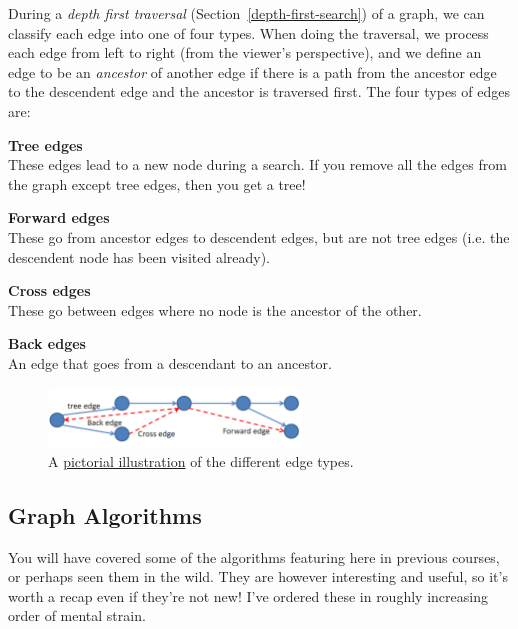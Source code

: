 During a \textit{depth first traversal} (Section~\ref{depth-first-search}) of a
graph, we can classify each edge into one of four types. When doing the
traversal, we process each edge from left to right (from the viewer's
perspective), and we define an edge to be an \textit{ancestor} of another edge
if there is a path from the ancestor edge to the descendent edge and the ancestor
is traversed first. The four types of edges are:

\begin{description}
  \item \textbf{Tree edges}\\
    These edges lead to a new node during a search. If you remove all the edges 
    from the graph except tree edges, then you get a tree!
  \item \textbf{Forward edges}\\
    These go from ancestor edges to descendent edges, but are not tree edges
    (i.e. the descendent node has been visited already).
  \item \textbf{Cross edges}\\
    These go between edges where no node is the ancestor of the other.
  \item \textbf{Back edges}\\
    An edge that goes from a descendant to an ancestor.
\end{description}

\begin{figure}[h]
  \centering
  \includegraphics[width=0.6\textwidth]{images/edge-types}
  \caption{A
  \href{http://courses.csail.mit.edu/6.006/spring11/rec/rec13.pdf}{pictorial
  illustration} of the different edge types.}
  \label{fig:connected-graph}
\end{figure}

\subsection{Graph Algorithms}

You will have covered some of the algorithms featuring here in previous courses,
or perhaps seen them in the wild. They are however interesting and useful, so
it's worth a recap even if they're not new! I've ordered these in roughly
increasing order of mental strain.

